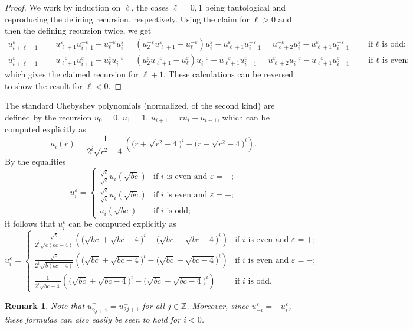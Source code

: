 \documentclass{amsart}
\newtheorem{remark}[theorem]{Remark}
\numberwithin{theorem}{section}
\newcommand{\ZZ}{\mathbb{Z}}
\begin{document}
  \begin{proof}
    We work by induction on $\ell$, the cases $\ell=0,1$ being tautological and reproducing the defining recursion, respectively.
    Using the claim for $\ell>0$ and then the defining recursion twice, we get
    \begin{align*}
      u_{i+\ell+1}^\varepsilon
      &=
      u_{\ell+1}^\varepsilon u_{i+1}^{-\varepsilon}-u_\ell^{-\varepsilon} u_i^\varepsilon
      =(u_2^{-\varepsilon} u_{\ell+1}^\varepsilon-u_\ell^{-\varepsilon}) u_i^\varepsilon-u_{\ell+1}^\varepsilon u_{i-1}^{-\varepsilon}
      =u_{\ell+2}^{-\varepsilon} u_i^\varepsilon - u_{\ell+1}^\varepsilon u_{i-1}^{-\varepsilon}
      \qquad \text{if $\ell$ is odd;}\\ 
      u_{i+\ell+1}^\varepsilon
      &=
      u_{\ell+1}^{-\varepsilon} u_{i+1}^\varepsilon-u_\ell^\varepsilon u_i^{-\varepsilon}
      =(u_2^\varepsilon u_{\ell+1}^{-\varepsilon}-u_\ell^\varepsilon) u_i^{-\varepsilon}-u_{\ell+1}^{-\varepsilon} u_{i-1}^\varepsilon
      =u_{\ell+2}^\varepsilon u_i^{-\varepsilon}-u_{\ell+1}^{-\varepsilon} u_{i-1}^\varepsilon
      \qquad \text{if $\ell$ is even;} 
    \end{align*}
    which gives the claimed recursion for $\ell+1$.
    These calculations can be reversed to show the result for $\ell<0$.
  \end{proof}

  The standard Chebyshev polynomials (normalized, of the second kind) are defined by the recursion $u_0=0$, $u_1=1$, $u_{i+1}=ru_i-u_{i-1}$, which can be computed explicitly as
  \[u_i(r)=\frac{1}{2^i\sqrt{r^2-4}}\left(\big(r+\sqrt{r^2-4}\big)^i-\big(r-\sqrt{r^2-4}\big)^i\right).\]
  By the equalities 
  \[u_i^\varepsilon=\begin{cases} \frac{\sqrt{b}}{\sqrt{c}}u_i(\sqrt{bc}) & \text{if $i$ is even and $\varepsilon=+$;}\\ \frac{\sqrt{c}}{\sqrt{b}}u_i(\sqrt{bc}) & \text{if $i$ is even and $\varepsilon=-$;}\\ u_i(\sqrt{bc}) & \text{if $i$ is odd;} \end{cases}\]
  it follows that $u_i^\varepsilon$ can be computed explicitly as
  \[u_i^\varepsilon=\begin{cases} \frac{\sqrt{b}}{2^i\sqrt{c(bc-4)}}\left(\big(\sqrt{bc}+\sqrt{bc-4}\big)^i-\big(\sqrt{bc}-\sqrt{bc-4}\big)^i\right) & \text{if $i$ is even and $\varepsilon=+$;}\\ \frac{\sqrt{c}}{2^i\sqrt{b(bc-4)}}\left(\big(\sqrt{bc}+\sqrt{bc-4}\big)^i-\big(\sqrt{bc}-\sqrt{bc-4}\big)^i\right) & \text{if $i$ is even and $\varepsilon=-$;}\\ \frac{1}{2^i\sqrt{bc-4}}\left(\big(\sqrt{bc}+\sqrt{bc-4}\big)^i-\big(\sqrt{bc}-\sqrt{bc-4}\big)^i\right) & \text{if $i$ is odd.} \end{cases}\]
  \begin{remark}
    Note that $u_{2j+1}^+=u_{2j+1}^-$ for all $j\in\ZZ$.
    Moreover, since $u_{-i}^\varepsilon=-u_i^\varepsilon$, these formulas can also easily be seen to hold for $i<0$.
  \end{remark}
\end{document}

